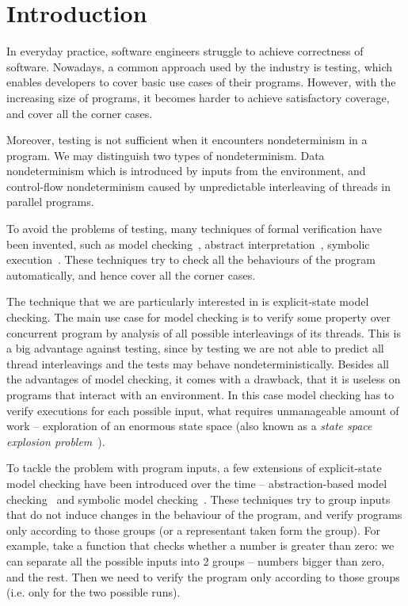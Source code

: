 \chapter{Introduction}\label{ch:Introduction}


\noindent

In everyday practice, software engineers struggle to achieve correctness of
software. Nowadays, a common approach used by the industry is testing, which
enables developers to cover basic use cases of their programs. However, with the
increasing size of programs, it becomes harder to achieve satisfactory
coverage, and cover all the corner cases.

Moreover, testing is not sufficient when it encounters nondeterminism in a
program. We may distinguish two types of nondeterminism. Data nondeterminism
which is introduced by inputs from the environment, and control-flow
nondeterminism caused by unpredictable interleaving of threads in parallel
programs.

To avoid the problems of testing, many techniques of formal verification have
been invented, such as model checking~\cite{Baier08}, abstract
interpretation~\cite{Cousot14}, symbolic execution~\cite{King76}. These
techniques try to check all the behaviours of the program automatically, and
hence cover all the corner cases.

The technique that we are particularly interested in is explicit-state model
checking. The main use case for model checking is to verify some
property over concurrent program by analysis of all possible
interleavings of its threads. This is a big advantage against testing, since
by testing we are not able to predict all thread interleavings and the tests may
behave nondeterministically. Besides all the advantages of model checking, it
comes with a drawback, that it is useless on programs that interact with an
environment. In this case model checking has to verify executions for each
possible input, what requires unmanageable amount of work -- exploration of an
enormous state space (also known as a \emph{state space explosion problem}~\cite{Clarke99}).

To tackle the problem with program inputs, a few extensions of explicit-state
model checking have been introduced over the time -- abstraction-based model
checking~\cite{Clarke94} and symbolic model checking~\cite{Clarke96}. These
techniques try to group inputs that do not induce changes in the behaviour of the
program, and verify programs only according to those groups (or a representant
taken form the group). For example, take a function that checks whether a
number is greater than zero: we can separate all the possible inputs into 2
groups -- numbers bigger than zero, and the rest. Then we need to verify the
program only according to those groups (i.e. only for the two possible runs).

